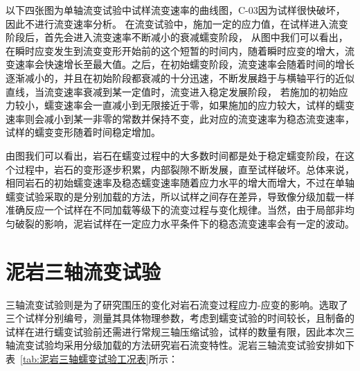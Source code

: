 以下四张图为单轴流变试验中试样流变速率的曲线图，C-03因为试样很快破坏，因此不进行流变速率分析。
在流变试验中，施加一定的应力值，在试样进入流变阶段后，首先会进入流变速率不断减小的衰减蠕变阶段，
从图中我们可以看出，在瞬时应变发生到流变变形开始前的这个短暂的时间内，随着瞬时应变的增大，流变速率会快速增长至最大值。之后，在初始蠕变阶段，流变速率会随着时间的增长逐渐减小的，并且在初始阶段都衰减的十分迅速，不断发展趋于与横轴平行的近似直线，当流变速率衰减到某一定值时，流变进入稳定发展阶段，
若施加的初始应力较小，蠕变速率会一直减小到无限接近于零，如果施加的应力较大，试样的蠕变速率则会减小到某一非零的常数并保持不变，此对应的流变速率为稳态流变速率，试样的蠕变变形随着时间稳定增加。

由图我们可以看出，岩石在蠕变过程中的大多数时间都是处于稳定蠕变阶段，在这个过程中，岩石的变形逐步积累，内部裂隙不断发展，直至试样破坏。总体来说，相同岩石的初始蠕变速率及稳态蠕变速率随着应力水平的增大而增大，不过在单轴蠕变试验采取的是分别加载的方法，所以试样之间存在差异，导致像分级加载一样准确反应一个试样在不同加载等级下的流变过程与变化规律。当然，由于局部非均匀破裂的影响，泥岩试样在一定应力水平条件下的稳态流变速率会有一定的波动。




\section{泥岩三轴流变试验}
三轴流变试验则是为了研究围压的变化对岩石流变过程应力-应变的影响。选取了三个试样分别编号，测量其具体物理参数，考虑到蠕变试验的时间较长，且制备的试样在进行蠕变试验前还需进行常规三轴压缩试验，试样的数量有限，因此本次三轴流变试验均采用分级加载的方法研究岩石流变特性。泥岩三轴流变试验安排如下表~\ref{tab:泥岩三轴蠕变试验工况表}所示：

